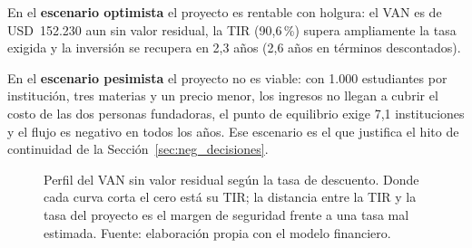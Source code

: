 En el \textbf{escenario optimista} el proyecto es rentable con holgura: el VAN es de USD~152.230 aun sin valor residual, la TIR (90,6\,\%) supera ampliamente la tasa exigida y la inversión se recupera en 2,3 años (2,6 años en términos descontados).

En el \textbf{escenario pesimista} el proyecto no es viable: con 1.000 estudiantes por institución, tres materias y un precio menor, los ingresos no llegan a cubrir el costo de las dos personas fundadoras, el punto de equilibrio exige 7,1 instituciones y el flujo es negativo en todos los años. Ese escenario es el que justifica el hito de continuidad de la Sección~\ref{sec:neg_decisiones}.

\begin{figure}[htbp]
    \centering
    \caption[Perfil del VAN sin valor residual según la tasa de descuento]{Perfil del VAN sin valor residual según la tasa de descuento. Donde cada curva corta el cero está su TIR; la distancia entre la TIR y la tasa del proyecto es el margen de seguridad frente a una tasa mal estimada. Fuente: elaboración propia con el modelo financiero.}
    \label{fig:neg_perfil_van}
\end{figure}

